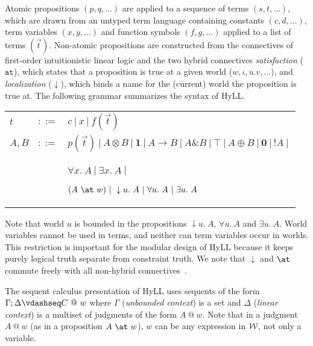 \documentclass{llncs}
\begin{document}
Atomic propositions $(p,q,\ldots)$ are applied to a sequence of terms 
$(s,t,\ldots)$, which are drawn from an untyped term language containing 
constants  $(c,d,\ldots)$, term variables $(x, y, \ldots)$ and function symbols 
$(f, g, \ldots)$ applied to a list of terms $(\vec{t})$. 
Non-atomic propositions are constructed from the connectives of first-order
intuitionistic linear logic and the two hybrid connectives 
\emph{satisfaction} ($\texttt{at}$), which states that a
proposition is true at a given world ($w, \iota, u.v, \ldots$), and
\emph{localization} ($\downarrow$), which binds a name for the (current) world 
the proposition is true at. 
The following grammar summarizes the syntax of HyLL.

\begin{tabular}{l@{\ }r@{\ }l}
  $t$ & $::=$ & 
       $c ~|~ x ~|~ f(\vec t)$ \\
  $A, B$ & $::=$ & 
       $p(\vec t) ~|~ A \otimes B ~|~ \mathbf{1} ~|~ A \rightarrow B ~|~ 
                A \mathbin{\&} B ~|~ \top ~|~
       A \oplus B ~|~  \mathbf{0} ~|~ ! A ~|~ $  \\
       & &
       $\forall x.~ A ~|~ \exists x.~ A ~|~ $

       $(A ~\at~ w) ~|~ \downarrow u.~ A ~|~ \forall u.~ A ~|~ \exists u.~ A$ \\
\end{tabular}

\noindent
Note that world $u$ is bounded in 
the propositions $\downarrow u.~A$, $\forall u.~ A$ and $\exists u.~ A$.
World variables cannot be used in terms, and neither can term variables occur in 
worlds. This restriction is important for the modular design of HyLL because it 
keeps purely logical truth separate from constraint truth.  
%
We note that $\downarrow$ and $\at$ commute freely with all non-hybrid 
connectives~\cite{ChaudhuriDespeyroux:14}.  

The sequent calculus  \cite{Gentzen35} presentation of HyLL uses sequents of
%
the form $\Gamma; \Delta \vdashseq C ~@~ w$ where 
$\Gamma$ (\emph{unbounded context}) is a set and 
$\Delta$ (\emph{linear context}) is a multiset
of judgments of the form $A ~@~ w$.
Note that in a judgment $A ~@~ w$ (as in a proposition $A ~\at~ w$), $w$ can be 
any expression in $\cal W$, not only a variable.
\end{document}
